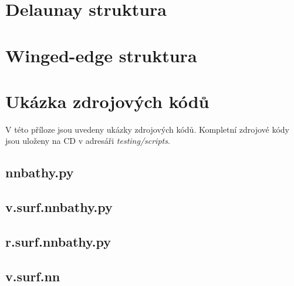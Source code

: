 \documentclass[12pt,a4paper]{article}
\begin{document}
\newpage
\section{Delaunay struktura}
\label{app:delaunay_struct}


\newpage
\section{Winged-edge struktura}
\label{app:edge_struct}



\newpage
\section{Ukázka zdrojových kódů}

V této příloze jsou uvedeny ukázky zdrojových kódů. Kompletní zdrojové kódy jsou uloženy na CD v adresáři \emph{testing/scripts}.
\subsection{nnbathy.py}
\label{app:nnbathy}


\bigskip
\subsection{v.surf.nnbathy.py}
\label{app:v.surf}


\newpage
\subsection{r.surf.nnbathy.py}
\label{app:r.surf}


\subsection{v.surf.nn}
\label{app:v.surf.nn}


\end{document}

